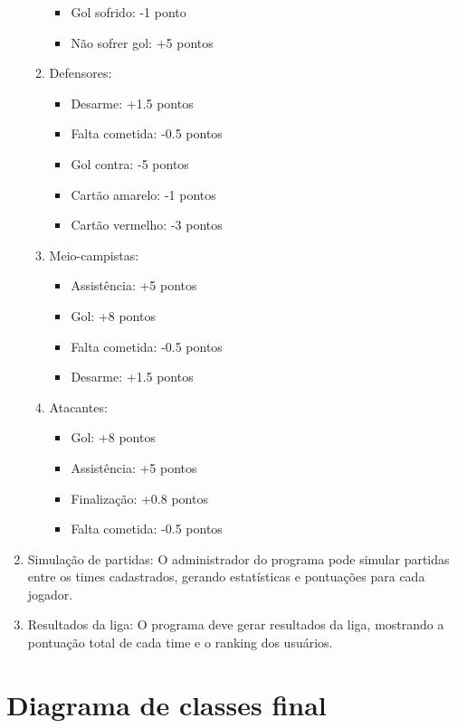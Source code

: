 \documentclass[12pt]{article}
\begin{document}
\begin{enumerate}
\begin{enumerate}
\begin{itemize}
                  \item Gol sofrido: -1 ponto
                  \item Não sofrer gol: +5 pontos
                \end{itemize}
          \item Defensores:
                \begin{itemize}
                  \item Desarme: +1.5 pontos
                  \item Falta cometida: -0.5 pontos
                  \item Gol contra: -5 pontos
                  \item Cartão amarelo: -1 pontos
                  \item Cartão vermelho: -3 pontos
                \end{itemize}
          \item Meio-campistas:
                \begin{itemize}
                  \item Assistência: +5 pontos
                  \item Gol: +8 pontos
                  \item Falta cometida: -0.5 pontos
                  \item Desarme: +1.5 pontos
                \end{itemize}
          \item Atacantes:
                \begin{itemize}
                  \item Gol: +8 pontos
                  \item Assistência: +5 pontos
                  \item Finalização: +0.8 pontos
                  \item Falta cometida: -0.5 pontos
                \end{itemize}
        \end{enumerate}
  \item Simulação de partidas: O administrador do programa pode simular partidas entre os times cadastrados, gerando estatísticas e pontuações para cada jogador.
  \item Resultados da liga: O programa deve gerar resultados da liga, mostrando a pontuação total de cada time e o ranking dos usuários.
\end{enumerate}

\section{Diagrama de classes final}
\label{sec:classes}
\end{document}
